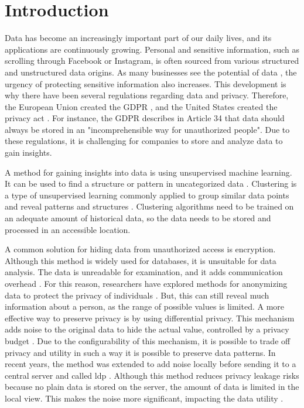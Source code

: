 \chapter{Introduction} \label{chapter:introduction}
Data has become an increasingly important part of our daily lives, and its applications are continuously growing.
Personal and sensitive information, such as scrolling through Facebook or Instagram, is often sourced from various structured and unstructured data origins.
As many businesses see the potential of data \citep{noauthor_global_nodate}, the urgency of protecting sensitive information also increases.
This development is why there have been several regulations regarding data and privacy.
Therefore, the European Union created the GDPR \citep{noauthor_eur-lex_nodate}, and the United States created the privacy act \citep{division_privacy_2007}.
For instance, the GDPR describes in Article 34 that data should always be stored in an "incomprehensible way for unauthorized people".
Due to these regulations, it is challenging for companies to store and analyze data to gain insights.

A method for gaining insights into data is using unsupervised machine learning.
It can be used to find a structure or pattern in uncategorized data \citep{dridi_unsupervised_2021}.
Clustering is a type of unsupervised learning commonly applied to group similar data points and reveal patterns and structures \citep{dridi_unsupervised_2021}.
Clustering algorithms need to be trained on an adequate amount of historical data, so the data needs to be stored and processed in an accessible location.

A common solution for hiding data from unauthorized access is encryption.
Although this method is widely used for databases, it is unsuitable for data analysis.
The data is unreadable for examination, and it adds communication overhead \citep{liu_when_2022}.
For this reason, researchers have explored methods for anonymizing data to protect the privacy of individuals \citep{sweeney_k-anonymity_2002}.
But, this can still reveal much information about a person, as the range of possible values is limited.
A more effective way to preserve privacy is by using differential privacy.
This mechanism adds noise to the original data to hide the actual value, controlled by a privacy budget \citep{dwork_differential_2006}.
Due to the configurability of this mechanism, it is possible to trade off privacy and utility in such a way it is possible to preserve data patterns.
In recent years, the method was extended to add noise locally before sending it to a central server and called \gls{ldp} \citep{kasiviswanathan_what_2010}.
Although this method reduces privacy leakage risks because no plain data is stored on the server, the amount of data is limited in the local view.
This makes the noise more significant, impacting the data utility \citep{yang_local_2020}.

